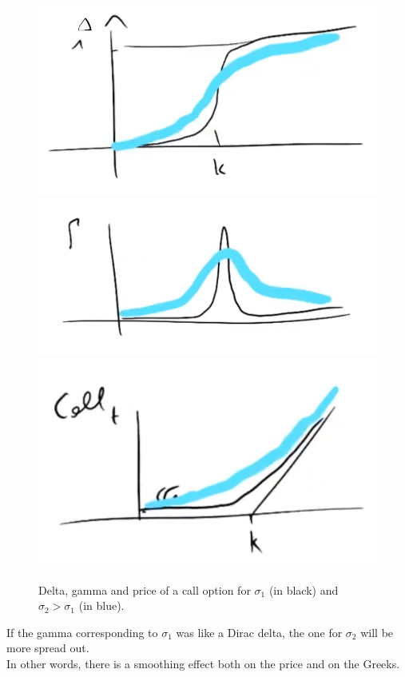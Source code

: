 \begin{figure}[htp]
    \centering
    \includegraphics[scale=0.3]{fig/tmp/fig21.png}
    \includegraphics[scale=0.3]{fig/tmp/fig22.png}
    \includegraphics[scale=0.3]{fig/tmp/fig20.png}
    \caption{Delta, gamma and price of a call option for $\sigma_1$ (in black) and $\sigma_2>\sigma_1$ (in blue).}
    \label{fig:call2}
\end{figure}
If the gamma corresponding to $\sigma_1$ was like a Dirac delta, the one for $\sigma_2$ will be more spread out.\\
In other words, there is a smoothing effect both on the price and on the Greeks.

